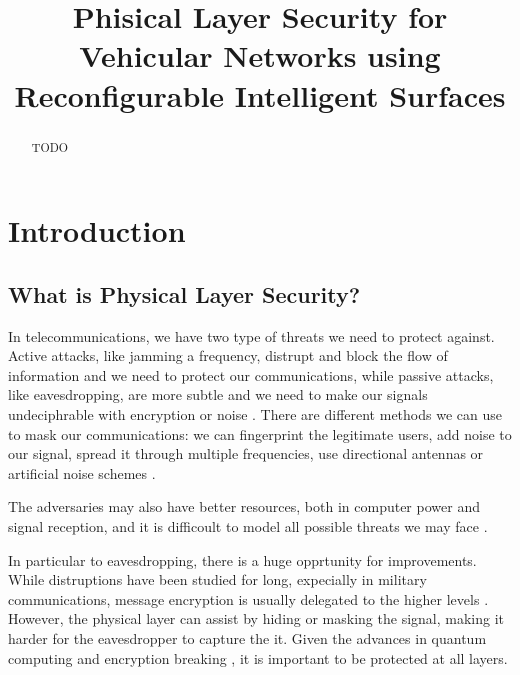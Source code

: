 \documentclass[conference]{IEEEtran}
\begin{document}
\title{Phisical Layer Security for Vehicular Networks using Reconfigurable Intelligent Surfaces}


\author{
}

\maketitle

\begin{abstract}
  TODO
\end{abstract}


\IEEEpeerreviewmaketitle

\section{Introduction}
\subsection{What is Physical Layer Security?}

In telecommunications, we have two type of threats we need to protect against. Active attacks, like jamming a frequency, distrupt and block the flow of information and we need to protect our communications, while passive attacks, like eavesdropping, are more subtle and we need to make our signals undeciphrable with encryption or noise \cite{5751298}. There are different methods we can use to mask our communications: we can fingerprint the legitimate users, add noise to our signal, spread it through multiple frequencies, use directional antennas or artificial noise schemes \cite{5751298}.

The adversaries may also have better resources, both in computer power and signal reception, and it is difficoult to model all possible threats we may face \cite{7120011}.

In particular to eavesdropping, there is a huge opprtunity for improvements. While distruptions have been studied for long, expecially in military communications, message encryption is usually delegated to the higher levels \cite{6739367}. However, the physical layer can assist by hiding or masking the signal, making it harder for the eavesdropper to capture the it. Given the advances in quantum computing and encryption breaking \cite{365700}, it is important to be protected at all layers.
\end{document}
